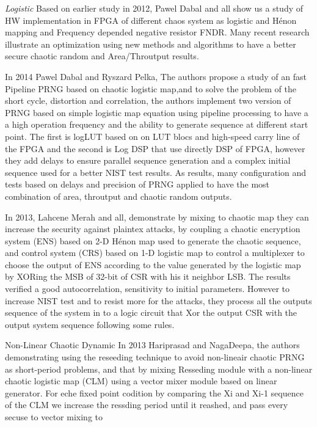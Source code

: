 \textit{Logistic} Based on earlier study in 2012, Pawel Dabal and all show us a study of HW implementation in FPGA of different chaos system as logistic and Hénon mapping and Frequency depended negative resistor FNDR. Many recent research illustrate an optimization using new methods and algorithms to have a better secure chaotic random and Area/Throutput results.

In 2014 Pawel Dabal and Ryszard Pelka, The authors propose a study of an fast Pipeline PRNG based on chaotic logistic map,and to solve the problem of the short cycle, distortion and correlation, the authors implement two version of PRNG based on simple logistic map equation using pipeline processing to have a a high operation frequency and the ability to generate sequence at different start point. The first is logLUT based on on LUT blocs and high-speed carry line of the FPGA and the second is Log DSP that use directly DSP of FPGA, however they add delays to ensure parallel sequence generation and a complex initial sequence used for a better NIST test results. As results, many configuration and tests based on delays and precision of PRNG applied to have the most combination of area, throutput and chaotic random outputs. 

In 2013, Lahcene Merah and all, demonstrate by mixing to chaotic map they can increase the security against plaintex attacks, by coupling a chaotic encryption system (ENS) based on 2-D Hénon map used to generate the chaotic sequence, and control system (CRS) based on 1-D logistic map to control a multiplexer to choose the output of ENS according to the value generated by the logistic map by XORing the MSB of 32-bit of CSR with his it neighbor LSB. The results verified a good autocorrelation, sensitivity to initial parameters. However to increase NIST test and to resist more for the attacks, they process all the outputs sequence of the system in to a logic circuit that Xor the output CSR with the output system sequence following some rules.

Non-Linear Chaotic Dynamic
In 2013 Hariprasad and NagaDeepa, the authors demonstrating using the reseeding technique to avoid non-lineair chaotic PRNG as short-period problems, and that by mixing Resseding module with a non-linear chaotic logistic map (CLM) using a vector mixer module based on linear generator. For eche fixed point codition by comparing the Xi and Xi-1 sequence of the CLM we increase the ressding period until it reashed, and pass every secuse to vector mixing to

